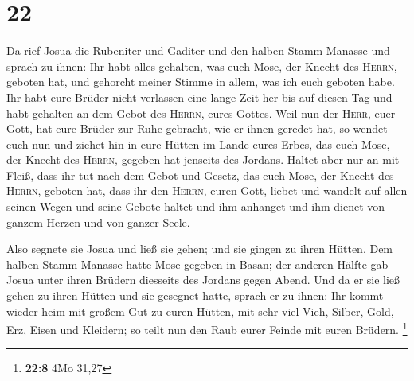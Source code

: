 \hypertarget{section-11}{%
\section{22}\label{section-11}}

 Da rief Josua die Rubeniter und Gaditer und den halben
Stamm Manasse  und sprach zu ihnen: Ihr habt alles
gehalten, was euch Mose, der Knecht des \textsc{Herrn}, geboten hat, und
gehorcht meiner Stimme in allem, was ich euch geboten habe.
 Ihr habt eure Brüder nicht verlassen eine lange Zeit her
bis auf diesen Tag und habt gehalten an dem Gebot des \textsc{Herrn},
eures Gottes.  Weil nun der \textsc{Herr}, euer Gott, hat
eure Brüder zur Ruhe gebracht, wie er ihnen geredet hat, so wendet euch
nun und ziehet hin in eure Hütten im Lande eures Erbes, das euch Mose,
der Knecht des \textsc{Herrn}, gegeben hat jenseits des Jordans.
 Haltet aber nur an mit Fleiß, dass ihr tut nach dem Gebot
und Gesetz, das euch Mose, der Knecht des \textsc{Herrn}, geboten hat,
dass ihr den \textsc{Herrn}, euren Gott, liebet und wandelt auf allen
seinen Wegen und seine Gebote haltet und ihm anhanget und ihm dienet von
ganzem Herzen und von ganzer Seele.

 Also segnete sie Josua und ließ sie gehen; und sie gingen
zu ihren Hütten.  Dem halben Stamm Manasse hatte Mose
gegeben in Basan; der anderen Hälfte gab Josua unter ihren Brüdern
diesseits des Jordans gegen Abend. Und da er sie ließ gehen zu ihren
Hütten und sie gesegnet hatte,  sprach er zu ihnen: Ihr
kommt wieder heim mit großem Gut zu euren Hütten, mit sehr viel Vieh,
Silber, Gold, Erz, Eisen und Kleidern; so teilt nun den Raub eurer
Feinde mit euren Brüdern. \footnote{\textbf{22:8} 4Mo 31,27}

